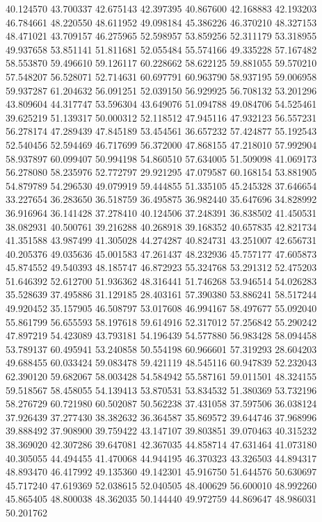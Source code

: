 40.124570
43.700337
42.675143
42.397395
40.867600
42.168883
42.193203
46.784661
48.220550
48.611952
49.098184
45.386226
46.370210
48.327153
48.471021
43.709157
46.275965
52.598957
53.859256
52.311179
53.318955
49.937658
53.851141
51.811681
52.055484
55.574166
49.335228
57.167482
58.553870
59.496610
59.126117
60.228662
58.622125
59.881055
59.570210
57.548207
56.528071
52.714631
60.697791
60.963790
58.937195
59.006958
59.937287
61.204632
56.091251
52.039150
56.929925
56.708132
53.201296
43.809604
44.317747
53.596304
43.649076
51.094788
49.084706
54.525461
39.625219
51.139317
50.000312
52.118512
47.945116
47.932123
56.557231
56.278174
47.289439
47.845189
53.454561
36.657232
57.424877
55.192543
52.540456
52.594469
46.717699
56.372000
47.868155
47.218010
57.992904
58.937897
60.099407
50.994198
54.860510
57.634005
51.509098
41.069173
56.278080
58.235976
52.772797
29.921295
47.079587
60.168154
53.881905
54.879789
54.296530
49.079919
59.444855
51.335105
45.245328
37.646654
33.227654
36.283650
36.518759
36.495875
36.982440
35.647696
34.828992
36.916964
36.141428
37.278410
40.124506
37.248391
36.838502
41.450531
38.082931
40.500761
39.216288
40.268918
39.168352
40.657835
42.821734
41.351588
43.987499
41.305028
44.274287
40.824731
43.251007
42.656731
40.205376
49.035636
45.001583
47.261437
48.232936
45.757177
47.605873
45.874552
49.540393
48.185747
46.872923
55.324768
53.291312
52.475203
51.646392
52.612700
51.936362
48.316441
51.746268
53.946514
54.026283
35.528639
37.495886
31.129185
28.403161
57.390380
53.886241
58.517244
49.920452
35.157905
46.508797
53.017608
46.994167
58.497677
55.092040
55.861799
56.655593
58.197618
59.614916
52.317012
57.256842
55.290242
47.897219
54.423089
43.793181
54.196439
54.577880
56.983428
58.094458
53.789137
60.495941
53.240858
50.554198
60.966601
57.319293
28.604203
49.688455
60.033424
59.083478
59.421119
48.545116
60.947839
52.232043
62.390120
59.682067
58.003428
54.584942
55.587161
59.011501
48.324155
59.518567
58.458055
54.139413
53.870531
53.834532
51.380369
53.732196
58.276729
60.721980
60.502087
50.562238
37.431058
37.597506
36.038124
37.926439
37.277430
38.382632
36.364587
35.869572
39.644746
37.968996
39.888492
37.908900
39.759422
43.147107
39.803851
39.070463
40.315232
38.369020
42.307286
39.647081
42.367035
44.858714
47.631464
41.073180
40.305055
44.494455
41.470068
44.944195
46.370323
43.326503
44.894317
48.893470
46.417992
49.135360
49.142301
45.916750
51.644576
50.630697
45.717240
47.619369
52.038615
52.040505
48.400629
56.600010
48.992260
45.865405
48.800038
48.362035
50.144440
49.972759
44.869647
48.986031
50.201762

